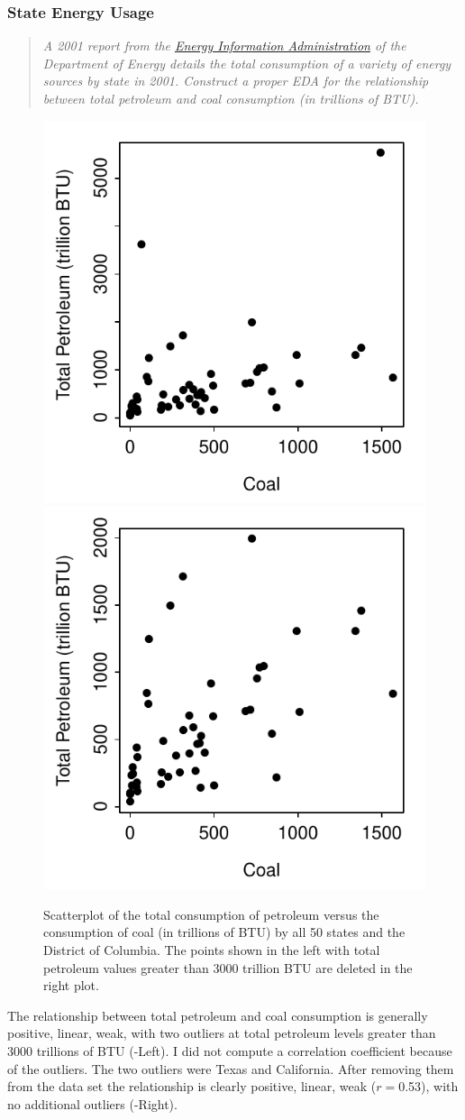 \documentclass[10pt,openany]{book}\usepackage[]{graphicx}\usepackage[]{color}
\newenvironment{knitrout}{}{} %
\begin{document}
\subsubsection{State Energy Usage}
\begin{quote}
\textit{A 2001 report from the \href{http://www.eia.doe.gov/}{Energy Information Administration} of the Department of Energy details the total consumption of a variety of energy sources by state in 2001.  Construct a proper EDA for the relationship between total petroleum and coal consumption (in trillions of BTU).}
\end{quote}
\begin{knitrout}
\color{fgcolor}\begin{figure}[hbtp]

{\centering \includegraphics[width=.4\linewidth]{Figs/scatNRG1-1} 
\includegraphics[width=.4\linewidth]{Figs/scatNRG1-2} 

}

\caption[Scatterplot of the total consumption of petroleum versus the consumption of coal (in trillions of BTU) by all 50 states and the District of Columbia]{Scatterplot of the total consumption of petroleum versus the consumption of coal (in trillions of BTU) by all 50 states and the District of Columbia.  The points shown in the left with total petroleum values greater than 3000 trillion BTU are deleted in the right plot.}\label{fig:scatNRG1}
\end{figure}


\end{knitrout}
The relationship between total petroleum and coal consumption is generally positive, linear, weak, with two outliers at total petroleum levels greater than 3000 trillions of BTU (-Left).  I did not compute a correlation coefficient because of the outliers.  The two outliers were Texas and California.  After removing them from the data set the relationship is clearly positive, linear, weak ($r=$0.53), with no additional outliers (-Right).
\end{document}
